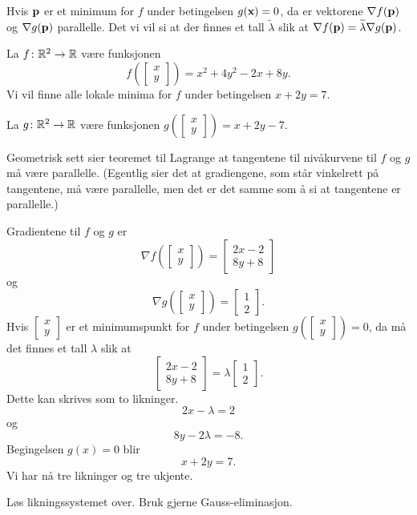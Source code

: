 \begin{teorem}
  Hvis $\mathbf{p}$ er et minimum for $f$ under betingelsen $g(\mathbf{x}) = 0$, da
  er vektorene $\nabla f(\mathbf{p})$ og $\nabla g(\mathbf{p})$ parallelle. Det vi
  vil si at der finnes et tall $\widetilde \lambda$ slik at $\nabla f(\mathbf{p})
  = \widetilde
  \lambda \nabla g(\mathbf{p})$.
\end{teorem}

\begin{eksempel}
  La $f\colon \mathbb{R}^2 \to \mathbb{R}$ være funksjonen
  $$f(\begin{bmatrix}x\\y\end{bmatrix}) = x^2 + 4y^2 -2x + 8y.$$
  Vi vil finne alle lokale minima for $f$ under betingelsen $x + 2y = 7$.

  La $g\colon \mathbb{R}^2 \to \mathbb{R}$ være funksjonen $g(\begin{bmatrix}x\\y\end{bmatrix})
  = x + 2y - 7$.

  Geometrisk sett sier teoremet til Lagrange at tangentene til nivåkurvene til
  $f$ og $g$ må være parallelle. (Egentlig sier det at gradiengene, som står
  vinkelrett på tangentene, må være parallelle, men det er det samme som å si
  at tangentene er parallelle.)

  Gradientene til $f$ og $g$ er
  $$\nabla f(\begin{bmatrix}x\\y\end{bmatrix}) = \begin{bmatrix}2x - 2\\8y + 8\end{bmatrix}$$
  og 
  $$\nabla g(\begin{bmatrix}x\\y\end{bmatrix}) = \begin{bmatrix}1\\2\end{bmatrix}.$$
  Hvis $\begin{bmatrix}x\\y\end{bmatrix}$ er et minimumspunkt for $f$ under betingelsen $g(\begin{bmatrix}x\\y\end{bmatrix}) = 0$, da må det finnes et tall $ \lambda$ slik at
  $$\begin{bmatrix}2x - 2\\8y + 8\end{bmatrix} =  \lambda
  \begin{bmatrix}1\\2\end{bmatrix}.$$
  Dette kan skrives som to likninger.
  $$
  2x - \lambda = 2$$
  og 
  $$
  8y - 2\lambda = -8.$$
  Begingelsen $g(x) = 0$ blir
  $$x + 2y = 7.$$
  Vi har nå tre likninger og tre ukjente.
\end{eksempel}
\begin{oppgave}
  Løs likningssystemet over. Bruk gjerne Gauss-eliminasjon.
\end{oppgave}



